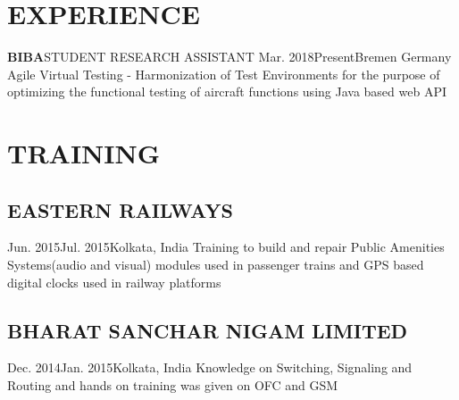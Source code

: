 \documentclass{article}
\begin{document}
\begin{minipage}[t]{0.58\textwidth}
\vspace{0.3cm}
\section{EXPERIENCE}
\large{\textbf{BIBA}\hspace{0.1cm}\textbar \hspace{0.1cm}STUDENT RESEARCH ASSISTANT}\newline
Mar. 2018\hspace{0.1cm}\textendash\hspace{0.1cm}Present\hspace{0.1cm}\textbar \hspace{0.1cm}Bremen Germany\newline
Agile Virtual Testing - Harmonization of Test Environments for the purpose of optimizing the functional testing of aircraft functions using Java based web API
\vspace{0.3cm}
\section{TRAINING}
\subsection{EASTERN RAILWAYS}
Jun. 2015\hspace{0.1cm}\textendash\hspace{0.1cm}Jul. 2015\hspace{0.1cm}\textbar \hspace{0.1cm}Kolkata, India\newline
Training to build and repair Public Amenities Systems(audio and visual) modules used in passenger trains and GPS based digital clocks used in railway platforms
\vspace{0.1cm}
\subsection{BHARAT SANCHAR NIGAM LIMITED}
Dec. 2014\hspace{0.1cm}\textendash\hspace{0.1cm}Jan. 2015\hspace{0.1cm}\hspace{0.1cm}\textbar \hspace{0.1cm}Kolkata, India\newline
Knowledge on Switching, Signaling and Routing and hands on training was given on OFC and GSM
\vspace{0.3cm}

\end{minipage}
\end{document}

